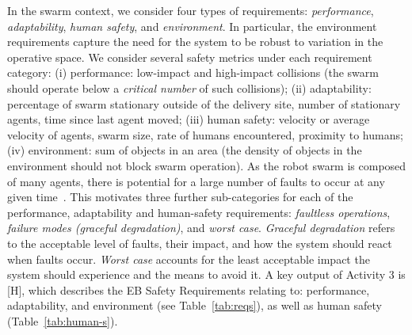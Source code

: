 \documentclass[runningheads]{llncs}
\begin{document}
In the swarm context, we consider four types of requirements: \emph{performance}, \emph{adaptability}, \emph{human safety}, and \emph{environment}. 
In particular, the environment requirements capture the need for the system to be robust to variation in the operative space.
We consider several safety metrics under each requirement category: 
(i) performance: low-impact and high-impact collisions (the swarm should operate below a \emph{critical number} of such collisions); %
(ii) adaptability: percentage of swarm stationary outside of the delivery site, number of stationary agents, time since last agent moved; 
(iii) human safety: velocity or average velocity of agents, swarm size, rate of humans encountered, proximity to humans;
(iv) environment: sum of objects in an area (the density of objects in the environment should not block swarm operation).
As the robot swarm is composed of many agents, there is potential for a large number of faults to occur at any given time~\cite{Lee2022}. This motivates three further sub-categories for each of the performance, adaptability and human-safety requirements: \emph{faultless operations}, \emph{failure modes (graceful degradation)}, and \emph{worst case}. 
\emph{Graceful degradation} refers to the acceptable level of faults, their impact, and how the system should react when faults occur. \emph{Worst case} accounts for the least acceptable impact the system should experience and the means to avoid it. 
A key output of Activity 3 is [H], which describes the EB Safety Requirements relating to: performance, adaptability, and environment (see Table~\ref{tab:reqs}), as well as human safety (Table~\ref{tab:human-s}).
\end{document}
